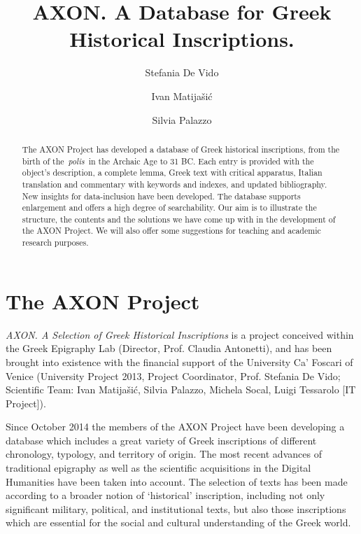 \documentclass[amsthm,ebook]{saparticle}
\title{AXON. A Database for Greek Historical Inscriptions.}
\author[cafo]{Stefania De Vido}
\author[cafo]{Ivan Matijašić\corref{first}}
\author[cafo]{Silvia Palazzo}
\begin{document}
\maketitle
\begin{abstract}
The AXON Project has developed a database of Greek historical inscriptions, from the birth of the~\emph{polis}~in the Archaic
Age to 31 BC. Each entry is provided with the object’s description, a complete lemma, Greek text with critical
apparatus, Italian translation and commentary with keywords and indexes, and updated bibliography. New insights for
data-inclusion have been developed. The database supports enlargement and offers a high degree of searchability. Our
aim is to illustrate the structure, the contents and the solutions we have come up with in the development of the AXON
Project. We will also offer some suggestions for teaching and academic research purposes.


\end{abstract}




\section{The AXON Project }


\noindent \emph{AXON. A Selection of Greek Historical Inscriptions} is a project conceived within the Greek Epigraphy Lab (Director, Prof. Claudia Antonetti), and has been brought into existence with the financial support of the University
Ca’ Foscari of Venice (University Project 2013, Project Coordinator, Prof. Stefania De Vido; Scientific Team: Ivan Matijašić, Silvia Palazzo, Michela Socal, Luigi Tessarolo [IT Project]).

Since October 2014 the members of the AXON Project have been developing a database which includes a great variety of
Greek inscriptions of different chronology, typology, and territory of origin. The most recent advances of traditional
epigraphy as well as the scientific acquisitions in the Digital Humanities have been taken into account. The selection
of texts has been made according to a broader notion of `historical' inscription, including not only significant
military, political, and institutional texts, but also those inscriptions which are essential for the social and
cultural understanding of the Greek world. 
\end{document}

